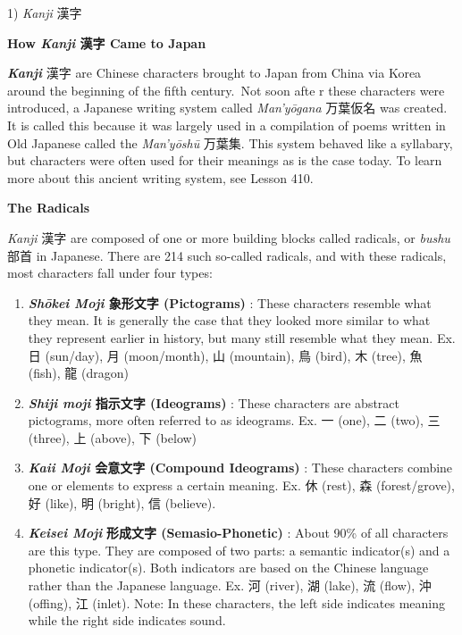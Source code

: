 \par{1) \emph{Kanji }漢字 \textbf{ }}

\begin{center}
\textbf{How \emph{Kanji }漢字 Came to Japan } \hfill\break

\end{center}

\par{\textbf{ \emph{Kanji } }漢字 \textbf{ }are Chinese characters brought to Japan from China via Korea around the beginning of the fifth century. Not soon afte r these characters were introduced, a Japanese writing system called \emph{Man'yōgana }万葉仮名 was created. It is called this because it was largely used in a compilation of poems written in Old Japanese called the \emph{Man'yōshū }万葉集. This system behaved like a syllabary, but characters were often used for their meanings as is the case today. To learn more about this ancient writing system, see Lesson 410. }

\begin{center}
\textbf{The Radicals }
\end{center}

\par{\emph{ Kanji }漢字 are composed of one or more building blocks called radicals, or \emph{bushu }部首 in Japanese. There are 214 such so-called radicals, and with these radicals, most characters fall under four types: }

\begin{enumerate}

\item \textbf{\emph{Shōkei Moji }象形文字 (Pictograms) }: These characters resemble what they mean. It is      generally the case that they looked more similar to what they represent earlier in history, but many still resemble what they mean. \hfill\break
Ex. 日 (sun\slash day), 月 (moon\slash month), 山 (mountain), 鳥 (bird), 木 (tree), 魚 (fish), 龍 (dragon) 
\item \textbf{\emph{Shiji moji }指示文字 (Ideograms) }: These characters      are abstract pictograms, more often referred to as ideograms. \hfill\break
Ex. 一 (one), 二 (two), 三 (three), 上 (above), 下 (below) 
\item \textbf{\emph{Kaii Moji }会意文字 (Compound Ideograms) }: These characters combine one or elements to express a certain meaning. \hfill\break
Ex. 休 (rest), 森 (forest\slash grove), 好 (like), 明 (bright), 信 (believe). 
\item \emph{\textbf{Keisei Moji }}\textbf{形成文字 (Semasio-Phonetic) }: About 90\% of all characters are this type. They are composed of two parts: a semantic indicator(s) and a phonetic indicator(s). Both indicators are based on the Chinese language rather than the Japanese language. Ex. 河 (river), 湖 (lake), 流 (flow), 沖 (offing), 江 (inlet). \hfill\break
Note: In these characters,      the left side indicates meaning while the right side indicates sound. 
\end{enumerate}

